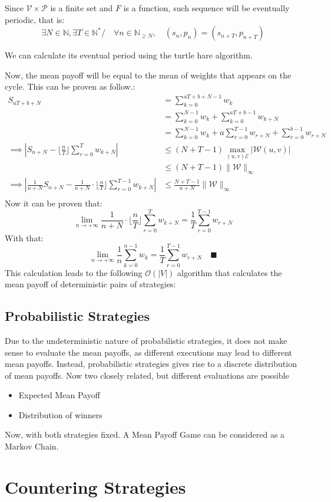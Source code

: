 Since $\mathcal{V} \times \mathcal{P}$ is a finite set and $F$ is a function, such sequence will be eventually periodic, that is:
$$
\exists N \in \mathbb{N},\exists T\in\mathbb{N}^*/\quad \forall n\in\mathbb{N}_{\ge N},\quad (s_{n},p_{n})=(s_{n+T},p_{n+T})
$$

We can calculate its eventual period using the turtle hare algorithm. %

Now, the mean payoff will be equal to the mean of weights that appears on the cycle. \newline
This can be proven as follow.:
\begin{align*}
	S_{aT+b+N}&=\sum_{k=0}^{aT+b+N-1} w_{k} \\
	&= \sum_{k=0}^{N-1}  w_{k}  + \sum_{k=0}^{aT+b-1} w_{k+N} \\
	&= \sum_{k=0}^{N-1}  w_{k}  + a\sum_{r=0}^{T-1} w_{r+N} +  \sum_{r=0}^{b-1} w_{r+N} \\
	\implies \left \lvert S_{n+N}- \lfloor \frac{n}{T}\rfloor \sum_{r=0}^T w_{k+N}  \right\rvert &\le (N+T-1) \max_{(u,v)\mathcal{E}} \lvert \mathcal{W}(u,v) \rvert  \\
	&\le (N+T-1) \lVert \mathcal{W} \rVert_{\infty} \\
\implies \left \lvert \frac{1}{n+N}S_{n+N}-\frac{1}{n+N} \cdot \lfloor \frac{n}{T}\rfloor \sum_{r=0}^{T-1} w_{k+N}  \right\rvert &\le \frac{N+T-1}{n+N}  \lVert \mathcal{W} \rVert_{\infty} \\
\end{align*}
Now it can be proven that:
$$
\lim_{n\rightarrow +\infty } \frac{1}{n+N} \cdot \lfloor \frac{n}{T}\rfloor \sum_{r=0}^T w_{k+N}  = \frac{1}{T}\sum_{r=0}^{T-1}w_{r+N}
$$
With that:
$$
\lim_{n\rightarrow +\infty} \frac{1}{n}\sum_{k=0}^{n-1} w_k=\frac{1}{T}\sum_{r=0}^{T-1}w_{r+N}  \quad \blacksquare
$$
This calculation leads to the following $\mathcal{O}(\lvert V \rvert)$ algorithm that calculates the mean payoff of deterministic pairs of strategies:



\subsection{Probabilistic Strategies}
Due to the undeterministic nature of probabilistic strategies, it does not make sense to evaluate the mean payoffs, as different executions may lead to different mean payoffs. \newline
Instead, probabilistic strategies gives rise to a discrete distribution of mean payoffs. \newline
Now two closely related, but different evaluations are possible
\begin{itemize}
	\item Expected Mean Payoff
	\item Distribution of winners 
\end{itemize}
Now, with both strategies fixed. A Mean Payoff Game can be considered as a Markov Chain.

\section{Countering Strategies}
